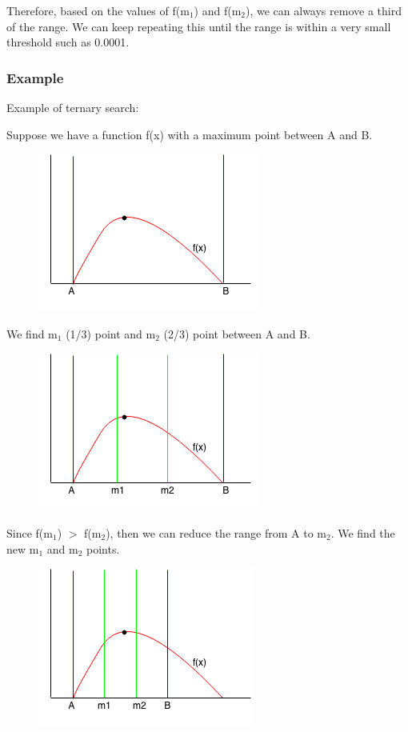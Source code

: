 \documentclass[11pt,oneside]{book}
\makeatletter
\def\maxwidth#1{\ifdim\Gin@nat@width>#1 #1\else\Gin@nat@width\fi}
\makeatother
\begin{document}
Therefore, based on the values of f(m$_{1}$) and f(m$_{2}$), we can always remove a third of the range. We can keep repeating this until the range is within a very small threshold such as 0.0001.

\subsubsection{Example}

Example of ternary search:

Suppose we have a function f(x) with a maximum point between A and B.

\vspace{5px}\begin{figure}[H]\centering
        \includegraphics[width=0.66\maxwidth{\textwidth}]{ternarysearch.png}
        \end{figure}

We find m$_{1}$ (1/3) point and m$_{2}$ (2/3) point between A and B.

\vspace{5px}\begin{figure}[H]\centering
        \includegraphics[width=0.66\maxwidth{\textwidth}]{ternarysearch2.png}
        \end{figure}

Since f(m$_{1}$) $>$ f(m$_{2}$), then we can reduce the range from A to m$_{2}$. We find the new m$_{1}$ and m$_{2}$ points.

\vspace{5px}\begin{figure}[H]\centering
        \includegraphics[width=0.66\maxwidth{\textwidth}]{ternarysearch3.png}
        \end{figure}
\end{document}
